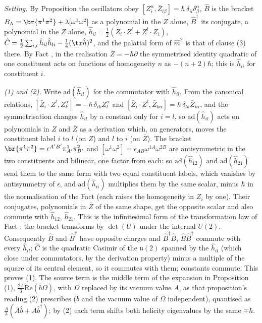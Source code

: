 \emph{Setting.} By Proposition  the oscillators obey $[Z^{\alpha}_{i}, \bar{Z}_{l\beta}] = \hbar\,\delta_{il}\delta^{\alpha}_{\beta}$, $\hat{B}$ is the bracket $B_{\Lambda} = \br{\pi^{1}\pi^{2}} + \lambda[\omega^{1}\omega^{2}]$ as a polynomial in the $Z$ alone, $\hat{B}^{\dagger}$ its conjugate, a polynomial in the $\bar{Z}$ alone, $\hat{h}_{il} = \tfrac12(\bar{Z}_{i}\cdot Z^{l} + Z^{l}\cdot\bar{Z}_{i})$, $\hat{C} = \tfrac12\sum_{i,l}\hat{h}_{il}\hat{h}_{li} - \tfrac14(\tr\hat{h})^{2}$, and the palatial form of $\hat{m}^{2}$ is that of clause (3) there. By Fact , in the realisation $\bar{Z} = -\hbar\partial$ the symmetrised identity quadratic of one constituent acts on functions of homogeneity $n$ as $-(n + 2)\hbar$; this is $\hat{h}_{ii}$ for constituent $i$.

\emph{(1) and (2).} Write $\mathrm{ad}(\hat{h}_{il})$ for the commutator with $\hat{h}_{il}$. From the canonical relations, $[\bar{Z}_{i}\cdot Z^{l}, Z^{\alpha}_{k}] = -\hbar\,\delta_{ik}Z^{\alpha}_{l}$ and $[\bar{Z}_{i}\cdot Z^{l}, \bar{Z}_{k\alpha}] = \hbar\,\delta_{lk}\bar{Z}_{i\alpha}$, and the symmetrisation changes $\hat{h}_{il}$ by a constant only for $i = l$, so $\mathrm{ad}(\hat{h}_{il})$ acts on polynomials in $Z$ and $\bar{Z}$ as a derivation which, on generators, moves the constituent label $i$ to $l$ (on $Z$) and $l$ to $i$ (on $\bar{Z}$). The bracket $\br{\pi^{1}\pi^{2}} = \epsilon^{A'B'}\pi^{1}_{A'}\pi^{2}_{B'}$ and $[\omega^{1}\omega^{2}] = \epsilon_{AB}\omega^{1A}\omega^{2B}$ are antisymmetric in the two constituents and bilinear, one factor from each: so $\mathrm{ad}(\hat{h}_{12})$ and $\mathrm{ad}(\hat{h}_{21})$ send them to the same form with two equal constituent labels, which vanishes by antisymmetry of $\epsilon$, and $\mathrm{ad}(\hat{h}_{ii})$ multiplies them by the same scalar, minus $\hbar$ in the normalisation of the Fact (each raises the homogeneity in $Z_{i}$ by one). Their conjugates, polynomials in $\bar{Z}$ of the same shape, get the opposite scalar and also commute with $\hat{h}_{12}$, $\hat{h}_{21}$. This is the infinitesimal form of the transformation law of Fact : the bracket transforms by $\det(U)$ under the internal $U(2)$. Consequently $\hat{B}$ and $\hat{B}^{\dagger}$ have opposite charges and $\hat{B}^{\dagger}\hat{B}$, $\hat{B}\hat{B}^{\dagger}$ commute with every $\hat{h}_{il}$; $\hat{C}$ is the quadratic Casimir of the $\mathfrak{u}(2)$ spanned by the $\hat{h}_{il}$ (which close under commutators, by the derivation property) minus a multiple of the square of its central element, so it commutes with them; constants commute. This proves (1). The source term is the middle term of the expansion in Proposition (1), $\tfrac{2\Lambda}{3}\mathrm{Re}(\bar{b}\Omega)$, with $\Omega$ replaced by its vacuum value $A$, as that proposition's reading (2) prescribes ($b$ and the vacuum value of $\Omega$ independent), quantised as $\tfrac{\Lambda}{3}(\bar{A}\hat{b} + A\hat{b}^{\dagger})$; by (2) each term shifts both helicity eigenvalues by the same $\mp\hbar$.

